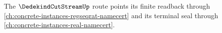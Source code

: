 The $\DedekindCutStreamUp$ route points its finite readback through \autoref{ch:concrete-instances-regseqrat-namecert} and its terminal seal through \autoref{ch:concrete-instances-real-namecert}.




